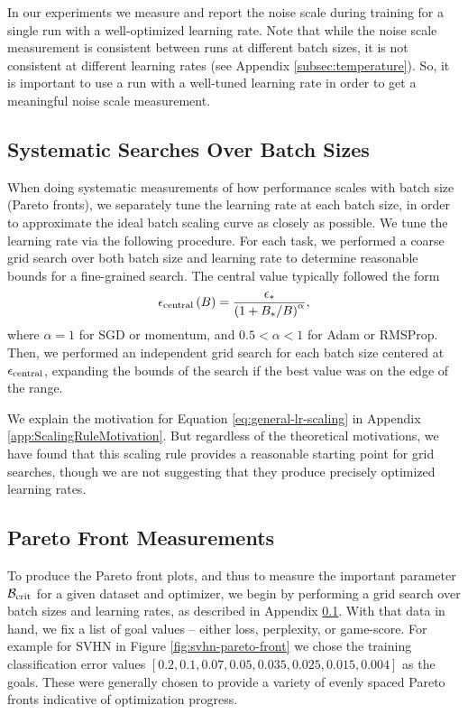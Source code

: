 \documentclass[english]{article}
\newcommand{\CB}{{\cal B}}
\begin{document}
In our experiments we measure and report the noise scale during training for a single run with a well-optimized learning rate.   Note that while the noise scale measurement is consistent between runs at different batch sizes, it is not consistent at different learning rates (see Appendix \ref{subsec:temperature}).  So, it is important to use a run with a well-tuned learning rate in order to get a meaningful noise scale measurement.

\subsection{Systematic Searches Over Batch Sizes}
\label{sec:learning-rate-scaling}

When doing systematic measurements of how performance scales with batch size (Pareto fronts), we  separately tune the learning rate at each batch size, in order to approximate the ideal batch scaling curve as closely as possible.  We tune the learning rate via the following procedure. For each task, we performed a coarse grid search over both batch size and learning rate to determine reasonable bounds for a fine-grained search. The central value typically followed the form
\begin{equation}
\epsilon_{{\rm central}}\left(B\right)=\frac{\epsilon_{\ast}}{\left(1+B_{\ast}/B\right)^{\alpha}},\label{eq:general-lr-scaling}
\end{equation}
where $\alpha=1$ for SGD or momentum, and $0.5<\alpha<1$ for Adam \cite{kingma2014adam} or RMSProp. Then, we performed an independent grid search for each batch size centered at $\epsilon_{{\rm central}}$, expanding the bounds of the search if the best value was on the edge of the range.

We explain the motivation for Equation \ref{eq:general-lr-scaling} in Appendix \ref{app:ScalingRuleMotivation}.  But regardless of the theoretical motivations, we have found that this scaling rule provides a reasonable starting point for grid searches, though we are not suggesting that they produce precisely optimized learning rates.



\subsection{Pareto Front Measurements}

To produce the Pareto front plots, and thus to measure the important parameter $\CB_{\rm crit}$ for a given dataset and optimizer, we begin by performing a grid search over batch sizes and learning rates, as described in Appendix \ref{sec:learning-rate-scaling}.  With that data in hand, we fix a list of goal values -- either loss, perplexity, or game-score.  For example for SVHN in Figure \ref{fig:svhn-pareto-front} we chose the training classification error values $[0.2, 0.1, 0.07, 0.05, 0.035, 0.025, 0.015, 0.004]$ as the goals.  These were generally chosen to provide a variety of evenly spaced Pareto fronts indicative of  optimization progress.
\end{document}
